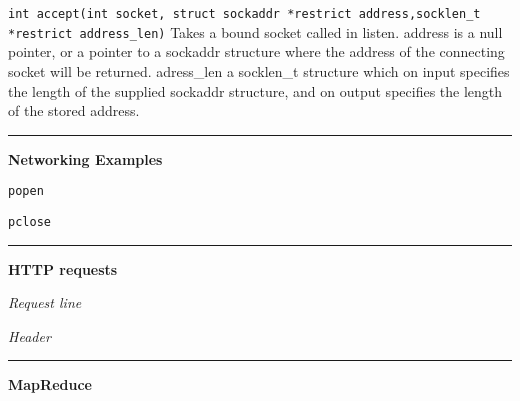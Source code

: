 \documentclass{article}
\begin{document}
\begin{multicols}{2}
  {\tt int accept(int socket, struct sockaddr *restrict address,socklen\_t
  *restrict address\_len)} Takes a bound socket called in listen. address is a
  null pointer, or a pointer to a sockaddr structure where the address of the
  connecting socket will be returned. adress\_len a socklen\_t structure which on
  input specifies the length of the supplied sockaddr structure, and on output
  specifies the length of the stored address.

  \noindent\rule{4cm}{0.4pt}

  {\bf Networking Examples}

  {\tt popen}

  {\tt pclose}

  \noindent\rule{4cm}{0.4pt}

  {\bf HTTP requests}

  {\it Request line}

  {\it Header}

  \noindent\rule{4cm}{0.4pt}

  {\bf MapReduce}

\end{multicols}
\end{document}
